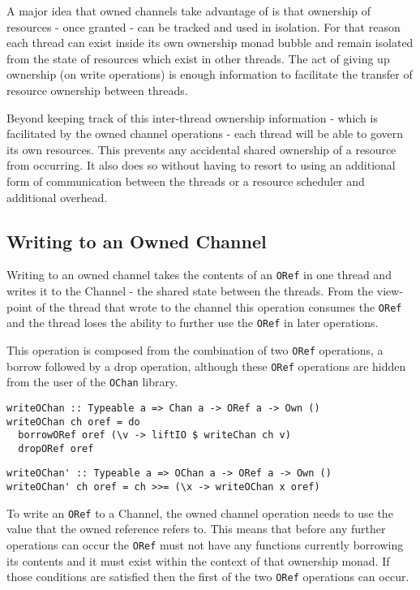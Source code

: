 \documentclass[onehalf,11pt]{beavtex}
\begin{document}
A major idea that owned channels take advantage of is that ownership
of resources - once granted - can be tracked and used in isolation. For that reason
each thread can exist inside its own ownership monad bubble and
remain isolated from the state of resources which exist in other threads.
The act of giving up ownership  (on write operations) is enough information to
facilitate the transfer of resource ownership between threads.

Beyond keeping track of this inter-thread ownership information - which is
facilitated by the owned channel operations - each thread will be able
to govern its own resources.  This prevents any accidental shared ownership of
a resource from occurring. It also does so without having to resort to using an
additional form of communication between the threads or a resource scheduler and
additional overhead. 

\subsection{Writing to an Owned Channel}

Writing to an owned channel takes the contents of an \texttt{ORef} in
one thread and writes it to the Channel - the shared state between the threads.
From the view-point of the thread that wrote to the channel this operation
consumes the \texttt{ORef} and the thread loses the ability to further use the
\texttt{ORef} in later operations.

This operation is composed from the combination of two
\texttt{ORef} operations, a borrow followed by a drop operation, 
although these \texttt{ORef} operations are hidden from the user of the
\texttt{OChan} library.

\begin{verbatim}
writeOChan :: Typeable a => Chan a -> ORef a -> Own ()
writeOChan ch oref = do
  borrowORef oref (\v -> liftIO $ writeChan ch v)
  dropORef oref
\end{verbatim}

\begin{verbatim}
writeOChan' :: Typeable a => OChan a -> ORef a -> Own ()
writeOChan' ch oref = ch >>= (\x -> writeOChan x oref)
\end{verbatim}

To write an \texttt{ORef} to a Channel, the owned channel operation
needs to use the value that the owned reference refers to.  This means
that before any further operations can occur the \texttt{ORef} must not have any
functions currently borrowing its contents and it must exist within the context
of that ownership monad.
If those conditions are satisfied then the first of the two \texttt{ORef}
operations can occur.
\end{document}

